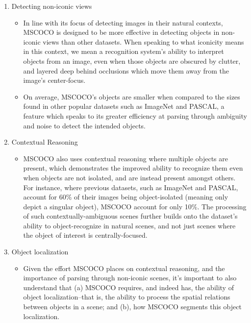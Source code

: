 \begin{enumerate}
    \item Detecting non-iconic views \begin{itemize}
        \item In line with its focus of detecting images in their natural contexts, MSCOCO is designed to be more effective in detecting objects in non-iconic views than other datasets. When speaking to what iconicity means in this context, we mean a recognition system’s ability to interpret objects from an image, even when those objects are obscured by clutter, and layered deep behind occlusions which move them away from the image’s center-focus.
        \item On average, MSCOCO’s objects are smaller when compared to the sizes found in other popular datasets such as ImageNet and PASCAL, a feature which speaks to its greater efficiency at parsing through ambiguity and noise to detect the intended objects.
        \end{itemize}
    \item Contextual Reasoning
        \begin{itemize}
            \item MSCOCO also uses contextual reasoning where multiple objects are present, which demonstrates the improved ability to recognize them even when objects are not isolated, and are instead present amongst others. For instance, where previous datasets, such as ImageNet and PASCAL, account for 60\% of their images being object-isolated (meaning only depict a singular object), MSCOCO account for only 10\%. The processing of such contextually-ambiguous scenes further builds onto the dataset’s ability to object-recognize in natural scenes, and not just scenes where the object of interest is centrally-focused. 
        \end{itemize} 
    \item Object localization
        \begin{itemize}
            \item Given the effort MSCOCO places on contextual reasoning, and the importance of parsing through non-iconic scenes, it’s important to also understand that (a) MSCOCO requires, and indeed has, the ability of object localization–that is, the ability to process the spatial relations between objects in a scene; and (b), how MSCOCO segments this object localization.
        \end{itemize}
\end{enumerate}

